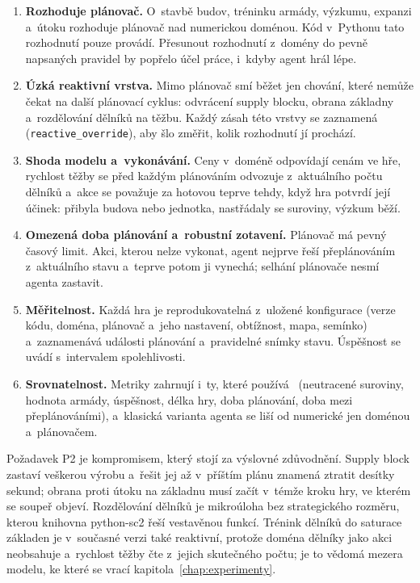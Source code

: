 \begin{enumerate}
	\item[P1] \textbf{Rozhoduje plánovač.} O~stavbě budov, tréninku armády, výzkumu, expanzi a~útoku rozhoduje plánovač nad numerickou doménou. Kód v~Pythonu tato rozhodnutí pouze provádí. Přesunout rozhodnutí z~domény do pevně napsaných pravidel by popřelo účel práce, i~kdyby agent hrál lépe.
	\item[P2] \textbf{Úzká reaktivní vrstva.} Mimo plánovač smí běžet jen chování, které nemůže čekat na další plánovací cyklus: odvrácení supply blocku, obrana základny a~rozdělování dělníků na těžbu. Každý zásah této vrstvy se zaznamená (\texttt{reactive\_override}), aby šlo změřit, kolik rozhodnutí jí prochází.
	\item[P3] \textbf{Shoda modelu a~vykonávání.} Ceny v~doméně odpovídají cenám ve hře, rychlost těžby se před každým plánováním odvozuje z~aktuálního počtu dělníků a~akce se považuje za hotovou teprve tehdy, když hra potvrdí její účinek: přibyla budova nebo jednotka, nastřádaly se suroviny, výzkum běží.
	\item[P4] \textbf{Omezená doba plánování a~robustní zotavení.} Plánovač má pevný časový limit. Akci, kterou nelze vykonat, agent nejprve řeší přeplánováním z~aktuálního stavu a~teprve potom ji vynechá; selhání plánovače nesmí agenta zastavit.
	\item[P5] \textbf{Měřitelnost.} Každá hra je reprodukovatelná z~uložené konfigurace (verze kódu, doména, plánovač a~jeho nastavení, obtížnost, mapa, semínko) a~zaznamenává události plánování a~pravidelné snímky stavu. Úspěšnost se uvádí s~intervalem spolehlivosti.
	\item[P6] \textbf{Srovnatelnost.} Metriky zahrnují i~ty, které používá~\cite{Orava2025} (neutracené suroviny, hodnota armády, úspěšnost, délka hry, doba plánování, doba mezi přeplánováními), a~klasická varianta agenta se liší od numerické jen doménou a~plánovačem.
\end{enumerate}

Požadavek P2 je kompromisem, který stojí za výslovné zdůvodnění. Supply block zastaví veškerou výrobu a~řešit jej až v~příštím plánu znamená ztratit desítky sekund; obrana proti útoku na základnu musí začít v~témže kroku hry, ve kterém se soupeř objeví. Rozdělování dělníků je mikroúloha bez strategického rozměru, kterou knihovna python-sc2 řeší vestavěnou funkcí. Trénink dělníků do saturace základen je v~současné verzi také reaktivní, protože doména dělníky jako akci neobsahuje a~rychlost těžby čte z~jejich skutečného počtu; je to vědomá mezera modelu, ke které se vrací kapitola~\ref{chap:experimenty}.

